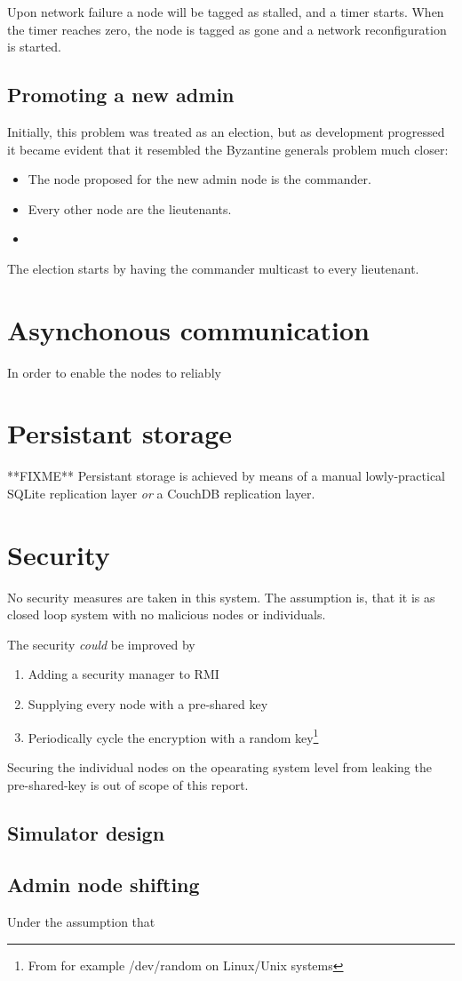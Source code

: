 \documentclass[10pt,a4paper]{article}
\begin{document}
Upon network failure a node will be tagged as stalled, and a timer starts. When the timer reaches zero, the node is tagged as gone and a network reconfiguration is started.

\subsection{Promoting a new admin}
Initially, this problem was treated as an election, but as development progressed it became evident that it resembled the Byzantine generals problem much closer:
\begin{itemize}
\item The node proposed for the new admin node is the commander.
\item Every other node are the lieutenants.
\item 
\end{itemize}

The election starts by having the commander multicast %
to every lieutenant.



\section{Asynchonous communication}
In order to enable the nodes to reliably 

\section{Persistant storage}
**FIXME** Persistant storage is achieved by means of a manual lowly-practical SQLite replication layer \emph{or} a CouchDB replication layer.

\section{Security}
No security measures are taken in this system. The assumption is, that it is as closed loop system with no malicious nodes or individuals.

The security \emph{could} be improved by 
\begin{enumerate}
\item Adding a security manager to RMI
\item Supplying every node with a pre-shared key
\item Periodically cycle the encryption with a random key\footnote{From for example /dev/random on Linux/Unix systems}
\end{enumerate}
Securing the individual nodes on the opearating system level from leaking the pre-shared-key is out of scope of this report.

\subsection{Simulator design}

\subsection{Admin node shifting}
Under the assumption that 
\end{document}
